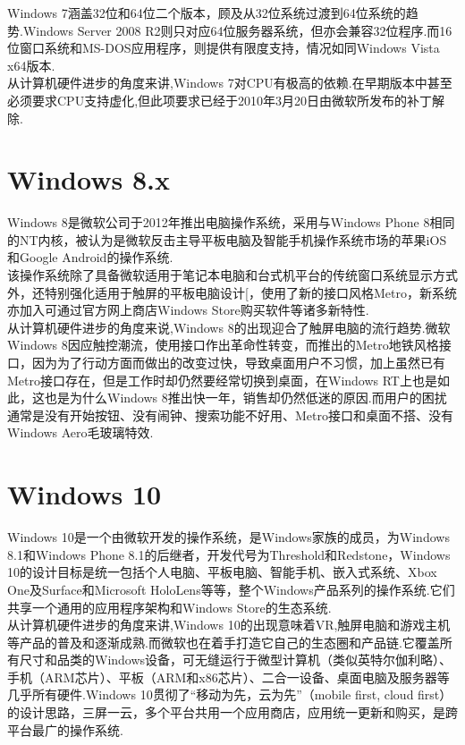 \documentclass[a4paper,12pt,notitlepage]{article}
\begin{document}
	Windows 7涵盖32位和64位二个版本，顾及从32位系统过渡到64位系统的趋势.Windows Server 2008 R2则只对应64位服务器系统，但亦会兼容32位程序.而16位窗口系统和MS-DOS应用程序，则提供有限度支持，情况如同Windows Vista x64版本. \\
	
	从计算机硬件进步的角度来讲,Windows 7对CPU有极高的依赖.在早期版本中甚至必须要求CPU支持虚化,但此项要求已经于2010年3月20日由微软所发布的补丁解除. \\
	
\section{Windows 8.x}

	Windows 8是微软公司于2012年推出电脑操作系统，采用与Windows Phone 8相同的NT内核，被认为是微软反击主导平板电脑及智能手机操作系统市场的苹果iOS和Google Android的操作系统. \\
	
	该操作系统除了具备微软适用于笔记本电脑和台式机平台的传统窗口系统显示方式外，还特别强化适用于触屏的平板电脑设计[，使用了新的接口风格Metro，新系统亦加入可通过官方网上商店Windows Store购买软件等诸多新特性. \\
	
	从计算机硬件进步的角度来说,Windows 8的出现迎合了触屏电脑的流行趋势.微软Windows 8因应触控潮流，使用接口作出革命性转变，而推出的Metro地铁风格接口，因为为了行动方面而做出的改变过快，导致桌面用户不习惯，加上虽然已有Metro接口存在，但是工作时却仍然要经常切换到桌面，在Windows RT上也是如此，这也是为什么Windows 8推出快一年，销售却仍然低迷的原因.而用户的困扰通常是没有开始按钮、没有闹钟、搜索功能不好用、Metro接口和桌面不搭、没有Windows Aero毛玻璃特效. \\
	
\section{Windows 10}

	Windows 10是一个由微软开发的操作系统，是Windows家族的成员，为Windows 8.1和Windows Phone 8.1的后继者，开发代号为Threshold和Redstone，Windows 10的设计目标是统一包括个人电脑、平板电脑、智能手机、嵌入式系统、Xbox One及Surface和Microsoft HoloLens等等，整个Windows产品系列的操作系统.它们共享一个通用的应用程序架构和Windows Store的生态系统. \\
	
	从计算机硬件进步的角度来讲,Windows 10的出现意味着VR,触屏电脑和游戏主机等产品的普及和逐渐成熟.而微软也在着手打造它自己的生态圈和产品链.它覆盖所有尺寸和品类的Windows设备，可无缝运行于微型计算机（类似英特尔伽利略）、手机（ARM芯片）、平板（ARM和x86芯片）、二合一设备、桌面电脑及服务器等几乎所有硬件.Windows 10贯彻了“移动为先，云为先”（mobile first, cloud first）的设计思路，三屏一云，多个平台共用一个应用商店，应用统一更新和购买，是跨平台最广的操作系统. \\
	
\end{document}
